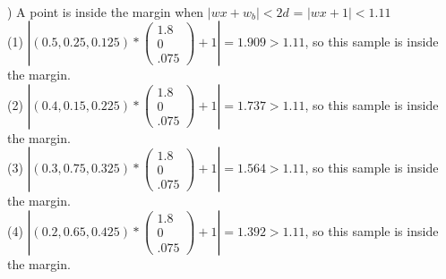 \documentclass[12pt]{article}
\begin{document}
\noindent \hrulefill \\



) A point is inside the margin when $|wx+w_b| < 2d$ = $|wx+1| < 1.11$\\[.4em]
\indent (1) $|(0.5, 0.25, 0.125)*
\begin{pmatrix}
1.8\\ 0\\ .075
\end{pmatrix}
 + 1|= 1.909 > 1.11$, so this sample is inside the margin.\\[.4em]

\indent (2) $|(0.4, 0.15, 0.225)*
\begin{pmatrix}
1.8\\ 0\\ .075
\end{pmatrix}
 + 1|= 1.737 > 1.11$, so this sample is inside the margin.\\[.4em]

\indent (3) $|(0.3, 0.75, 0.325)*
\begin{pmatrix}
1.8\\ 0\\ .075
\end{pmatrix}
 + 1|= 1.564 > 1.11$, so this sample is inside the margin.\\[.4em]

\indent (4) $|(0.2, 0.65, 0.425)*
\begin{pmatrix}
1.8\\ 0\\ .075
\end{pmatrix}
 + 1|= 1.392 > 1.11$, so this sample is inside the margin.\\



\noindent \hrulefill \\
\end{document}
